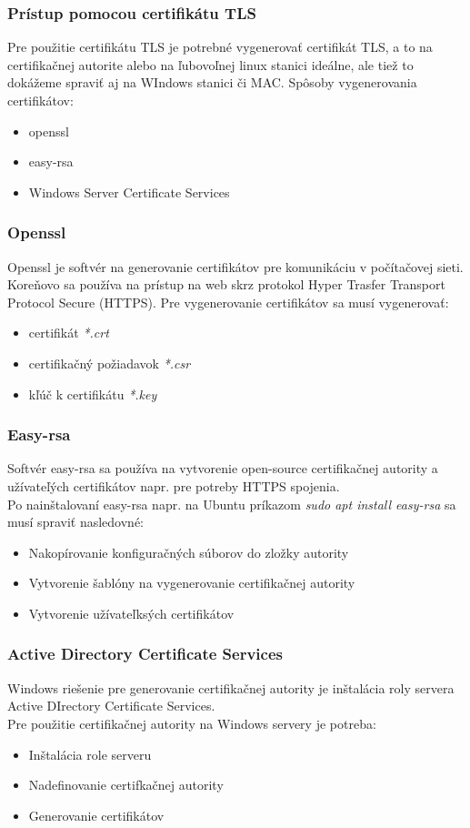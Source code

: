 \subsubsection{Prístup pomocou certifikátu TLS}
Pre použitie certifikátu TLS je potrebné vygenerovať certifikát TLS, a to na certifikačnej autorite alebo na ľubovoľnej linux stanici ideálne, ale tiež to dokážeme spraviť aj na WIndows stanici či MAC. 
Spôsoby vygenerovania certifikátov:
\begin{itemize}
\item openssl
\item easy-rsa 
\item Windows Server Certificate Services
\end{itemize}
\subsubsection{Openssl}
Openssl \cite{OpenSSL} je softvér na generovanie certifikátov pre komunikáciu v počítačovej sieti. Koreňovo sa používa na prístup na web skrz protokol Hyper Trasfer Transport Protocol Secure (HTTPS). Pre vygenerovanie certifikátov sa musí vygenerovať: \begin{itemize}
\item certifikát \textit{*.crt}
\item certifikačný požiadavok \textit{*.csr}
\item kľúč k certifikátu \textit{*.key}
\end{itemize}
\subsubsection{Easy-rsa}
Softvér easy-rsa \cite{EasyRSA} sa používa na vytvorenie open-source certifikačnej autority a užívateľých certifikátov napr. pre potreby HTTPS spojenia.\\
Po nainštalovaní easy-rsa napr. na Ubuntu príkazom \textit{sudo apt install easy-rsa} sa musí spraviť nasledovné: \begin{itemize}
\item Nakopírovanie konfiguračných súborov do zložky autority
\item Vytvorenie šablóny na vygenerovanie certifikačnej autority
\item Vytvorenie užívateľksých certifikátov
\end{itemize}
\subsubsection{Active Directory Certificate Services}
Windows riešenie \cite{WindowsCA} pre generovanie  certifikačnej autority je inštalácia roly servera Active DIrectory Certificate Services. \\
Pre použitie certifikačnej autority na Windows servery je potreba:
\begin{itemize}
\item Inštalácia role serveru
\item Nadefinovanie certifkačnej autority
\item Generovanie certifikátov
\end{itemize}
